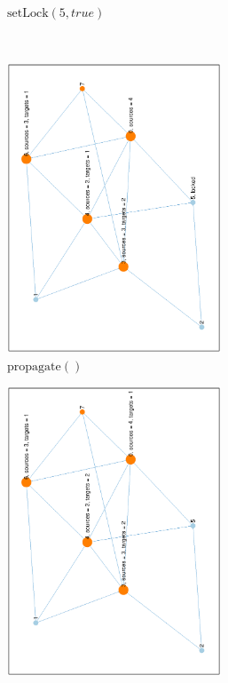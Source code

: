 \documentclass[12pt]{report}
\begin{document}
\begin{figure}[H]
\begin{subfigure}{0.45\textwidth}
	\caption{$ \mathrm{setLock}(5, \mathit{true}) $}
\end{subfigure}
\\
\begin{subfigure}{0.45\textwidth}
	\includegraphics[width=0.7\textwidth,angle=-90]{graph/example/2.eps}
	\caption{$ \mathrm{propagate}() $}
\end{subfigure}
\begin{subfigure}{0.45\textwidth}
	\includegraphics[width=0.7\textwidth,angle=-90]{graph/example/3.eps}

\end{subfigure}
\end{figure}
\end{document}
